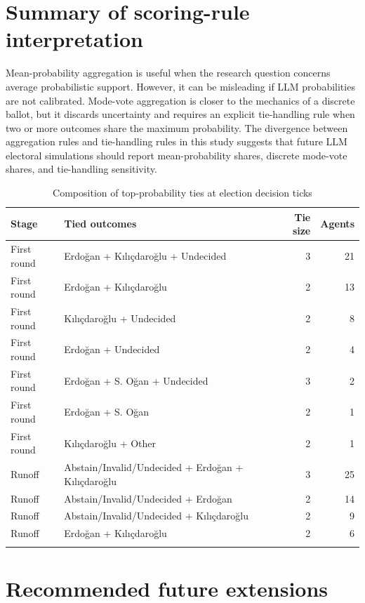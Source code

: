 \documentclass[pdflatex,sn-mathphys-num,iicol]{sn-jnl}
\begin{document}
\begin{appendices}

\section{Summary of scoring-rule interpretation}\label{app:scoring}

Mean-probability aggregation is useful when the research question concerns average probabilistic support. However, it can be misleading if LLM probabilities are not calibrated. Mode-vote aggregation is closer to the mechanics of a discrete ballot, but it discards uncertainty and requires an explicit tie-handling rule when two or more outcomes share the maximum probability. The divergence between aggregation rules and tie-handling rules in this study suggests that future LLM electoral simulations should report mean-probability shares, discrete mode-vote shares, and tie-handling sensitivity.

\begin{table}[!htbp]
\caption{Composition of top-probability ties at election decision ticks}
\label{tab:tie_composition}
\centering
\footnotesize
\begin{tabular}{@{}llrr@{}}
\toprule
Stage & Tied outcomes & Tie size & Agents \\
\midrule
First round & Erdoğan + Kılıçdaroğlu + Undecided & 3 & 21 \\
First round & Erdoğan + Kılıçdaroğlu & 2 & 13 \\
First round & Kılıçdaroğlu + Undecided & 2 & 8 \\
First round & Erdoğan + Undecided & 2 & 4 \\
First round & Erdoğan + S. Oğan + Undecided & 3 & 2 \\
First round & Erdoğan + S. Oğan & 2 & 1 \\
First round & Kılıçdaroğlu + Other & 2 & 1 \\
\midrule
Runoff & Abstain/Invalid/Undecided + Erdoğan + Kılıçdaroğlu & 3 & 25 \\
Runoff & Abstain/Invalid/Undecided + Erdoğan & 2 & 14 \\
Runoff & Abstain/Invalid/Undecided + Kılıçdaroğlu & 2 & 9 \\
Runoff & Erdoğan + Kılıçdaroğlu & 2 & 6 \\
\botrule
\end{tabular}
\normalsize
\end{table}
\FloatBarrier

\section{Recommended future extensions}\label{app:future}


\end{appendices}
\end{document}
